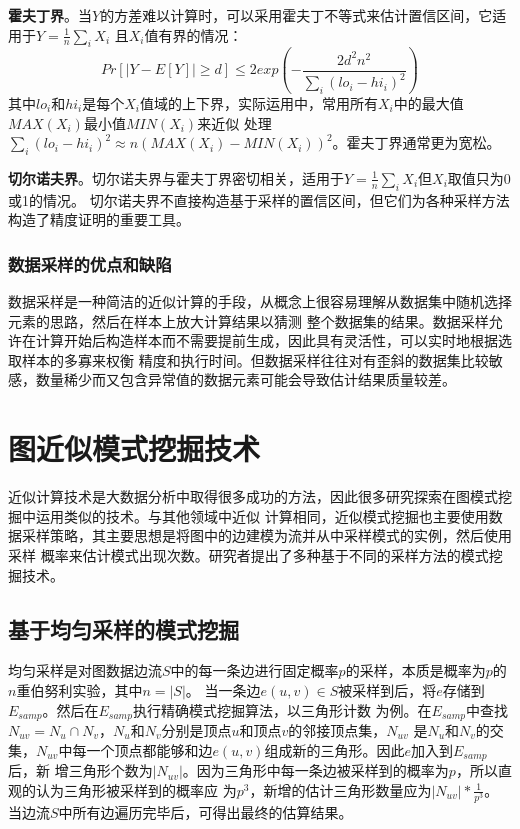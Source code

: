 \documentclass[master]{thesis-uestc}
\begin{document}
    \textbf{霍夫丁界}。当$Y$的方差难以计算时，可以采用霍夫丁不等式来估计置信区间，它适用于$Y=\frac{1}{n}\sum_iX_i$
且$X_i$值有界的情况：
\begin{equation*}
    Pr\left[\vert Y-E[Y] \vert \ge d \right] \le 2exp\left(-\frac{2d^2n^2}{\sum_i(lo_i-hi_i)^2}\right)
\end{equation*}
其中$lo_i$和$hi_i$是每个$X_i$值域的上下界，实际运用中，常用所有$X_i$中的最大值$MAX(X_i)$最小值$MIN(X_i)$来近似
处理$\sum_i(lo_i-hi_i)^2 \approx n(MAX(X_i) - MIN(X_i))^2$。霍夫丁界通常更为宽松。

    \textbf{切尔诺夫界}。切尔诺夫界与霍夫丁界密切相关，适用于$Y=\frac{1}{n}\sum_iX_i$但$X_i$取值只为0或1的情况。
切尔诺夫界不直接构造基于采样的置信区间，但它们为各种采样方法构造了精度证明的重要工具。

\subsubsection{数据采样的优点和缺陷}
\label{subsubsec:advantages-drawbacks}
    数据采样是一种简洁的近似计算的手段，从概念上很容易理解从数据集中随机选择元素的思路，然后在样本上放大计算结果以猜测
整个数据集的结果。数据采样允许在计算开始后构造样本而不需要提前生成，因此具有灵活性，可以实时地根据选取样本的多寡来权衡
精度和执行时间。但数据采样往往对有歪斜的数据集比较敏感，数量稀少而又包含异常值的数据元素可能会导致估计结果质量较差。


\section{图近似模式挖掘技术}
\label{sec:graph-approximate}
    近似计算技术是大数据分析中取得很多成功的方法，因此很多研究探索在图模式挖掘中运用类似的技术。与其他领域中近似
计算相同，近似模式挖掘也主要使用数据采样策略，其主要思想是将图中的边建模为流并从中采样模式的实例，然后使用采样
概率来估计模式出现次数。研究者提出了多种基于不同的采样方法的模式挖掘技术。

\subsection{基于均匀采样的模式挖掘}
\label{subsec:uniform}
    均匀采样是对图数据边流$S$中的每一条边进行固定概率$p$的采样，本质是概率为$p$的$n$重伯努利实验，其中$n=|S|$。
当一条边$e(u, v) \in S$被采样到后，将$e$存储到$E_{samp}$。然后在$E_{samp}$执行精确模式挖掘算法，以三角形计数
为例。在$E_{samp}$中查找$N_{uv}=N_u \cap N_v$，$N_u$和$N_v$分别是顶点$u$和顶点$v$的邻接顶点集，$N_{uv}$
是$N_u$和$N_v$的交集，$N_{uv}$中每一个顶点都能够和边$e(u, v)$组成新的三角形。因此$e$加入到$E_{samp}$后，新
增三角形个数为$|N_{uv}|$。因为三角形中每一条边被采样到的概率为$p$，所以直观的认为三角形被采样到的概率应
为$p^3$，新增的估计三角形数量应为$|N_{uv}|*\frac{1}{p^3}$。当边流$S$中所有边遍历完毕后，可得出最终的估算结果。
\end{document}
